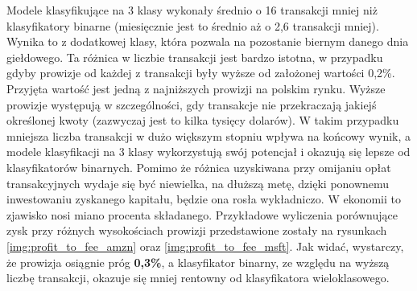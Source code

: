 \documentclass[a4paper, twoside, 11pt, openright]{article}
\begin{document}
 Modele klasyfikujące na 3 klasy wykonały średnio o 16 transakcji mniej niż klasyfikatory binarne (miesięcznie jest to średnio aż o 2,6 transakcji mniej). Wynika to z dodatkowej klasy, która pozwala na pozostanie biernym danego dnia giełdowego. Ta różnica w liczbie transakcji jest bardzo istotna, w przypadku gdyby prowizje od każdej z transakcji były wyższe od założonej wartości 0,2\%. Przyjęta wartość jest jedną z najniższych prowizji na polskim rynku. Wyższe prowizje występują w szczególności, gdy transakcje nie przekraczają jakiejś określonej kwoty (zazwyczaj jest to kilka tysięcy dolarów). W takim przypadku mniejsza liczba transakcji w dużo większym stopniu wpływa na końcowy wynik, a modele klasyfikacji na 3 klasy wykorzystują swój potencjał i okazują się lepsze od klasyfikatorów binarnych. Pomimo że różnica uzyskiwana przy omijaniu opłat transakcyjnych wydaje się być niewielka, na dłuższą metę, dzięki ponownemu inwestowaniu zyskanego kapitału, będzie ona rosła wykładniczo. W ekonomii to zjawisko nosi miano procenta składanego. Przykładowe wyliczenia porównujące zysk przy różnych wysokościach prowizji przedstawione zostały na rysunkach \ref{img:profit_to_fee_amzn} oraz \ref{img:profit_to_fee_msft}. Jak widać, wystarczy, że prowizja osiągnie próg \textbf{0,3\%}, a klasyfikator binarny, ze względu na wyższą liczbę transakcji, okazuje się mniej rentowny od klasyfikatora wieloklasowego.
 
\end{document}
